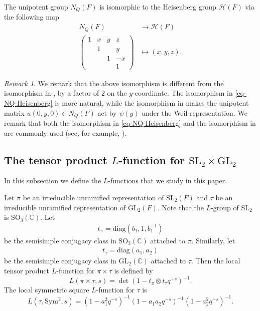 \documentclass[11pt]{amsart}
\theoremstyle{definition}
\theoremstyle{remark}
\newtheorem{remark}[theorem]{Remark}
\begin{document}
The unipotent group $N_Q(F)$ is isomorphic to the Heisenberg group $\mathcal{H}(F)$ via the following map
\begin{equation} 
\label{eq-NQ-Heisenberg}
\begin{split}
N_Q(F)    &\to \mathcal{H}(F)           \\
 \left(\begin{smallmatrix} 1 & x & y & z\\ &1 & &y\\ &&1&-x\\&&&1 \end{smallmatrix}\right)  &\mapsto  (x, y, z).
\end{split}
\end{equation}

\begin{remark}
\label{remark-1}
We remark that the above isomorphism is different from the isomorphism in \cite[Section 1.3]{GinzburgRallisSoudry1998}, by a factor of $2$ on the $y$-coordinate. The isomorphism in \eqref{eq-NQ-Heisenberg} is more natural, while the isomorphism in \cite[Section 1.3]{GinzburgRallisSoudry1998} makes the unipotent matrix $u(0,y,0)\in N_Q(F)$ act by $\psi(y)$ under the Weil representation. We remark that both the isomorphism in \eqref{eq-NQ-Heisenberg} and the isomorphism in \cite[Section 1.3]{GinzburgRallisSoudry1998} are commonly used (see, for example, \cite{GinzburgSoudry2020, Yan2021, Zhang2018}). 
\end{remark}



\subsection{The tensor product $L$-function for $\mathrm{SL}_2\times \mathrm{GL}_2$}
In this subsection we define the $L$-functions that we study in this paper. 

Let $\pi$ be an irreducible unramified representation of $\mathrm{SL}_2(F)$ and $\tau$ be an irreducible unramified representation of $\mathrm{GL}_2(F)$. Note that the $L$-group of $\mathrm{SL}_2$ is $\mathrm{SO}_3(\mathbb{C})$. Let
\begin{equation*}
\begin{split}
t_{\pi}=\mathrm{diag}(b_1, 1, b_1^{-1})
\end{split}
\end{equation*}
be the semisimple conjugacy class in $\mathrm{SO}_3(\mathbb{C})$ attached to $\pi$. Similarly, let 
\begin{equation*}
\begin{split}
t_{\tau}=\mathrm{diag}(a_{1}, a_{2})
\end{split}
\end{equation*}
be the semisimple conjugacy class in $\mathrm{GL}_2(\mathbb{C})$ attached to $\tau$. Then the local tensor product $L$-function for $\pi \times \tau$ is defined by
$$
L(\pi \times \tau, s)=\det(1 - t_{\pi} \otimes t_{\tau} q^{-s})^{-1}.
$$
The local symmetric square $L$-function for $\tau$ is
\begin{equation*}
L(\tau, \mathrm{Sym}^2, s)=(1-a_{1}^2 q^{-s})^{-1} (1-a_{1} a_{2} q^{-s})^{-1} (1-a_{2}^2 q^{-s})^{-1} .
\end{equation*}
\end{document}
